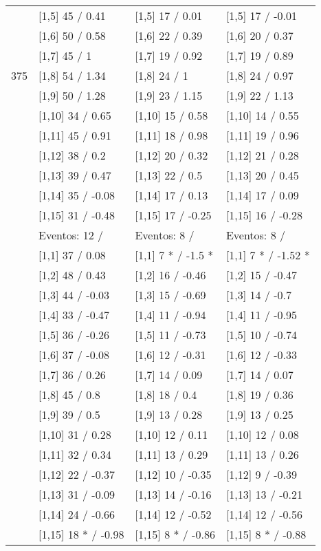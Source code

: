 \begin{table}
\begin{tabular}[t]{llll}
 & {}[1,5] 45  / 0.41 & {}[1,5] 17  / 0.01 & {}[1,5] 17  / -0.01\\
 & {}[1,6] 50  / 0.58 & {}[1,6] 22  / 0.39 & {}[1,6] 20  / 0.37\\
 & {}[1,7] 45  / 1 & {}[1,7] 19  / 0.92 & {}[1,7] 19  / 0.89\\
375 & {}[1,8] 54  / 1.34 & {}[1,8] 24  / 1 & {}[1,8] 24  / 0.97\\
\addlinespace
 & {}[1,9] 50  / 1.28 & {}[1,9] 23  / 1.15 & {}[1,9] 22  / 1.13\\
 & {}[1,10] 34  / 0.65 & {}[1,10] 15  / 0.58 & {}[1,10] 14  / 0.55\\
 & {}[1,11] 45  / 0.91 & {}[1,11] 18  / 0.98 & {}[1,11] 19  / 0.96\\
 & {}[1,12] 38  / 0.2 & {}[1,12] 20  / 0.32 & {}[1,12] 21  / 0.28\\
 & {}[1,13] 39  / 0.47 & {}[1,13] 22  / 0.5 & {}[1,13] 20  / 0.45\\
\addlinespace
 & {}[1,14] 35  / -0.08 & {}[1,14] 17  / 0.13 & {}[1,14] 17  / 0.09\\
 & {}[1,15] 31  / -0.48 & {}[1,15] 17  / -0.25 & {}[1,15] 16  / -0.28\\
 & Eventos:  12 / & Eventos:  8 / & Eventos:  8 /\\
 & {}[1,1] 37  / 0.08 & {}[1,1] 7 * / -1.5 * & {}[1,1] 7 * / -1.52 *\\
 & {}[1,2] 48  / 0.43 & {}[1,2] 16  / -0.46 & {}[1,2] 15  / -0.47\\
\addlinespace
 & {}[1,3] 44  / -0.03 & {}[1,3] 15  / -0.69 & {}[1,3] 14  / -0.7\\
 & {}[1,4] 33  / -0.47 & {}[1,4] 11  / -0.94 & {}[1,4] 11  / -0.95\\
 & {}[1,5] 36  / -0.26 & {}[1,5] 11  / -0.73 & {}[1,5] 10  / -0.74\\
 & {}[1,6] 37  / -0.08 & {}[1,6] 12  / -0.31 & {}[1,6] 12  / -0.33\\
 & {}[1,7] 36  / 0.26 & {}[1,7] 14  / 0.09 & {}[1,7] 14  / 0.07\\
\addlinespace
500 & {}[1,8] 45  / 0.8 & {}[1,8] 18  / 0.4 & {}[1,8] 19  / 0.36\\
 & {}[1,9] 39  / 0.5 & {}[1,9] 13  / 0.28 & {}[1,9] 13  / 0.25\\
 & {}[1,10] 31  / 0.28 & {}[1,10] 12  / 0.11 & {}[1,10] 12  / 0.08\\
 & {}[1,11] 32  / 0.34 & {}[1,11] 13  / 0.29 & {}[1,11] 13  / 0.26\\
 & {}[1,12] 22  / -0.37 & {}[1,12] 10  / -0.35 & {}[1,12] 9  / -0.39\\
\addlinespace
 & {}[1,13] 31  / -0.09 & {}[1,13] 14  / -0.16 & {}[1,13] 13  / -0.21\\
 & {}[1,14] 24  / -0.66 & {}[1,14] 12  / -0.52 & {}[1,14] 12  / -0.56\\
 & {}[1,15] 18 * / -0.98 & {}[1,15] 8 * / -0.86 & {}[1,15] 8 * / -0.88\\
\bottomrule
\end{tabular}
\end{table}
